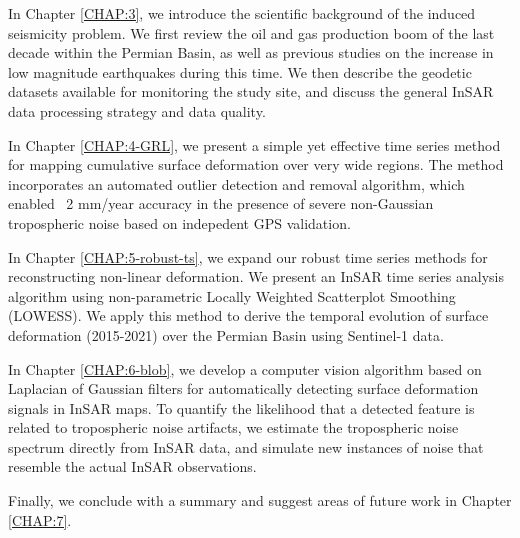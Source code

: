 In Chapter \ref{CHAP:3}, we introduce the scientific background of the induced seismicity problem. We first review the oil and gas production boom of the last decade within the Permian Basin, as well as previous studies on the increase in low magnitude earthquakes during this time. We then describe the geodetic datasets available for monitoring the study site, and discuss the general InSAR data processing strategy and data quality.


In Chapter \ref{CHAP:4-GRL}, we present a simple yet effective time series method for mapping cumulative surface deformation over very wide regions. The method incorporates an automated outlier detection and removal algorithm, which enabled ~2 mm/year accuracy in the presence of severe non-Gaussian tropospheric noise based on indepedent GPS validation.


In Chapter \ref{CHAP:5-robust-ts}, we expand our robust time series methods for reconstructing non-linear deformation. We present an InSAR time series analysis algorithm using non-parametric Locally Weighted Scatterplot Smoothing (LOWESS). We apply this method to derive the temporal evolution of surface deformation (2015-2021) over the Permian Basin using Sentinel-1 data.


In Chapter \ref{CHAP:6-blob}, we develop a computer vision algorithm based on Laplacian of Gaussian filters for automatically detecting surface deformation signals in InSAR maps. To quantify the likelihood that a detected feature is related to tropospheric noise artifacts, we estimate the tropospheric noise spectrum directly from InSAR data, and simulate new instances of noise that resemble the actual InSAR observations. 


Finally, we conclude with a summary and suggest areas of future work in Chapter \ref{CHAP:7}.

